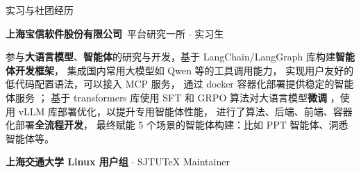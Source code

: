 \documentclass[a4paper]{article}
\newenvironment{cvitems}{
    \begin{justify}
    \begin{description}[
        labelwidth=2.0cm,
        leftmargin=2.5cm,
        labelsep=0.5cm,
        parsep=0pt,
        align=right
    ]
    
}{
    \end{description}
    \end{justify}
}
\def\section#1{
    \noindent\hskip2.5cm \textsf{\large #1} \hrulefill
}
\begin{document}
    \section{实习与社团经历}
    \begin{cvitems}
        \item[2024.9--] \textbf{上海宝信软件股份有限公司}~平台研究一所 $\cdot$ 实习生


        参与\textbf{大语言模型}、\textbf{智能体}的研究与开发，基于 \textsf{LangChain}/\textsf{LangGraph} 库构建\textbf{智能体开发框架}，
        集成国内常用大模型如 Qwen 等的工具调用能力，
        实现用户友好的低代码配置语法，可以接入 \textsf{MCP} 服务，
        通过 \textsf{docker} 容器化部署提供稳定的智能体服务
        ；
        基于 \textsf{transformers} 库使用 SFT 和 GRPO 算法对大语言模型\textbf{微调}%
        ，使用 \textsf{vLLM} 库部署优化，以提升专用智能体性能，
        进行了算法、后端、前端、容器化部署\textbf{全流程开发}，
        最终赋能 5 个场景的智能体构建：比如 PPT 智能体、洞悉智能体等。
        
        \item[2021.9--] \textbf{上海交通大学 Linux 用户组} $\cdot$ SJTU\TeX{} Maintainer
        


\end{cvitems}
\end{document}
